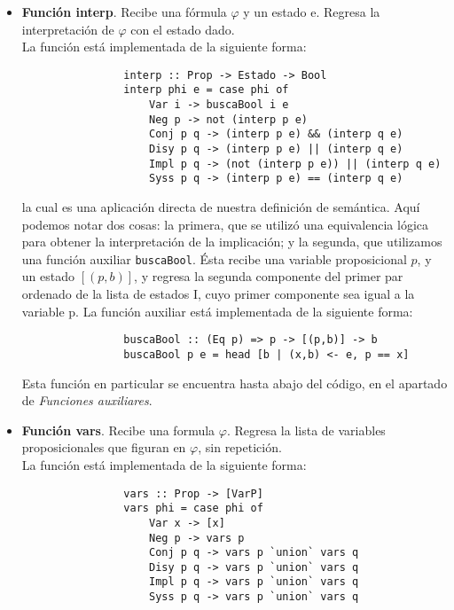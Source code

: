 \documentclass[letterpaper,12pt]{article}
\begin{document}
\begin{itemize}
        \begin{itemize}
            \item \textbf{Función interp}. Recibe una fórmula $\varphi$ y un 
            estado e. Regresa la interpretación de $\varphi$ con el estado 
            dado.\\
            La función está implementada de la siguiente forma:
            \begin{lstlisting}
                interp :: Prop -> Estado -> Bool
                interp phi e = case phi of 
                    Var i -> buscaBool i e
                    Neg p -> not (interp p e)
                    Conj p q -> (interp p e) && (interp q e)
                    Disy p q -> (interp p e) || (interp q e)
                    Impl p q -> (not (interp p e)) || (interp q e)
                    Syss p q -> (interp p e) == (interp q e)
            \end{lstlisting}
            la cual es una aplicación directa de nuestra definición de 
            semántica. Aquí podemos notar dos cosas: la primera, que se 
            utilizó una equivalencia lógica para obtener la interpretación 
            de la implicación; y la segunda, que utilizamos una función 
            auxiliar \texttt{buscaBool}. Ésta recibe una variable proposicional
            $p$, y un estado $[(p,b)]$, y regresa la segunda componente del 
            primer par ordenado de la lista de estados I, cuyo primer 
            componente sea igual a la variable p.
            La función auxiliar está implementada de la siguiente forma:
            \begin{lstlisting}
                buscaBool :: (Eq p) => p -> [(p,b)] -> b 
                buscaBool p e = head [b | (x,b) <- e, p == x]
            \end{lstlisting}
            
            Esta función en particular se encuentra hasta abajo del código, en
            el apartado de \textit{Funciones auxiliares}.

            \item \textbf{Función vars}. Recibe una formula $\varphi$. Regresa
            la lista de variables proposicionales que figuran en $\varphi$, 
            sin repetición. \\
            La función está implementada de la siguiente forma:
            \begin{lstlisting}
                vars :: Prop -> [VarP]
                vars phi = case phi of
                    Var x -> [x]
                    Neg p -> vars p
                    Conj p q -> vars p `union` vars q
                    Disy p q -> vars p `union` vars q
                    Impl p q -> vars p `union` vars q
                    Syss p q -> vars p `union` vars q
            \end{lstlisting}


\end{itemize}
\end{itemize}
\end{document}
